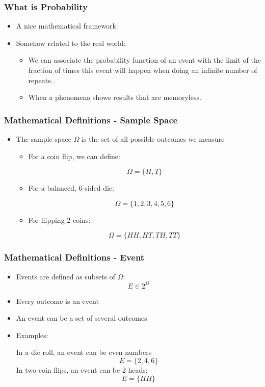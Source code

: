 \documentclass{beamer}
\begin{document}
\begin{frame}
\frametitle{What is Probability}
\begin{itemize}
\item A nice mathematical framework
\item Somehow related to the real world:
\begin{itemize}
\item We can associate the probability function of an event with the limit of the fraction of times this event will happen when doing an infinite number of repeats.
\item When a phenomena shows results that are memoryless.
\end{itemize}
\end{itemize}

\end{frame}


\begin{frame}
\frametitle{Mathematical Definitions - Sample Space}
\begin{itemize}
\item The sample space $\Omega$ is the set of all possible outcomes we measure
\begin{itemize}
\item For a coin flip, we can define:

$$ 	\Omega=\{ H,T \} $$
\item For a balanced, 6-sided die:

$$ \Omega=\{ 1,2,3,4,5,6 \} $$
\item For flipping 2 coins:

$$ \Omega=\{ HH, HT, TH, TT \} $$
\end{itemize}

\end{itemize}
\end{frame}


\begin{frame}
\frametitle{Mathematical Definitions - Event}
\begin{itemize}
\item Events are defined as subsets of $\Omega$:
$$ E \in 2^{\Omega} $$
\item Every outcome is an event
\item An event can be a set of several outcomes
\item Examples:

In a die roll, an event can be even numbers $$E=\{ 2, 4, 6\}$$
In two coin flips, an event can be 2 heads:
$$ E=\{HH\} $$
\end{itemize}
\end{frame}
\end{document}
